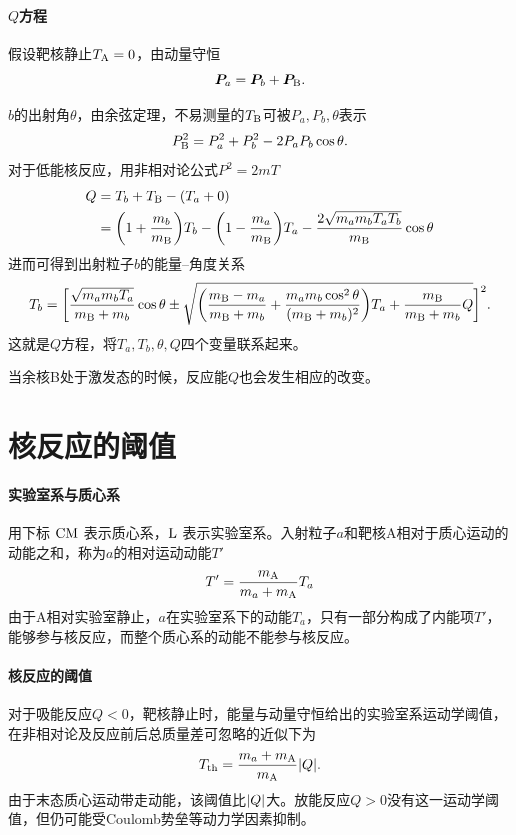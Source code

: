 \paragraph{$Q$方程}假设靶核静止$T_{\mathrm{A}} = 0$，由动量守恒
\[
	\bm P_a = \bm P_b + \bm P_{\mathrm{B}}.
\]
\begin{notecaptionblock}
\end{notecaptionblock}
$b$的出射角$\theta$，由余弦定理，不易测量的$T_{\mathrm{B}}$可被$P_a,P_b,\theta$表示
\[
	P_{\mathrm{B}}^2 = P_a^2 + P_b^2 - 2P_aP_b\cos\theta.
\]
对于低能核反应，用非相对论公式$P^2 = 2mT$
\begin{align}\notag
	Q &= T_b + T_{\mathrm{B}} - (T_a + 0)\\
	&= \biggl(1 + \frac{m_b}{m_{\mathrm{B}}}\biggr)T_b - \biggl(1 - \frac{m_a}{m_{\mathrm{B}}}\biggr)T_a - \frac{2\sqrt{m_am_bT_aT_b}}{m_{\mathrm{B}}}\cos\theta
\end{align}
进而可得到出射粒子$b$的能量--角度关系
\begin{align}
	T_b = \biggl[\frac{\sqrt{m_am_bT_a}}{m_{\mathrm{B}} + m_b}\cos\theta \pm \sqrt{\biggl(\frac{m_{\mathrm{B}} - m_a}{m_{\mathrm{B}} + m_b} + \frac{m_am_b\cos^2\theta}{(m_{\mathrm{B}} + m_b)^2}\biggr)T_a + \frac{m_{\mathrm{B}}}{m_{\mathrm{B}} + m_b}Q}\biggr]^2.
\end{align}
这就是$Q$方程，将$T_a,T_b,\theta,Q$四个变量联系起来。

当余核B处于激发态的时候，反应能$Q$也会发生相应的改变。

\section{核反应的阈值}
\paragraph{实验室系与质心系}
用下标 $\mathrm{CM}$ 表示质心系，$\mathrm L$ 表示实验室系。入射粒子$a$和靶核A相对于质心运动的动能之和，称为$a$的相对运动动能$T'$
\begin{align}
	T' = \frac{m_{\mathrm{A}}}{m_a + m_{\mathrm{A}}}T_a
\end{align}
由于A相对实验室静止，$a$在实验室系下的动能$T_a$，只有一部分构成了内能项$T'$，能够参与核反应，而整个质心系的动能不能参与核反应。

\paragraph{核反应的阈值}
对于吸能反应$Q < 0$，靶核静止时，能量与动量守恒给出的实验室系运动学阈值，在非相对论及反应前后总质量差可忽略的近似下为
\begin{align}
	T_{\mathrm{th}} = \frac{m_a + m_{\mathrm{A}}}{m_{\mathrm{A}}}\lvert Q\rvert.
\end{align}
由于末态质心运动带走动能，该阈值比$\lvert Q\rvert$大。放能反应$Q > 0$没有这一运动学阈值，但仍可能受Coulomb势垒等动力学因素抑制。
